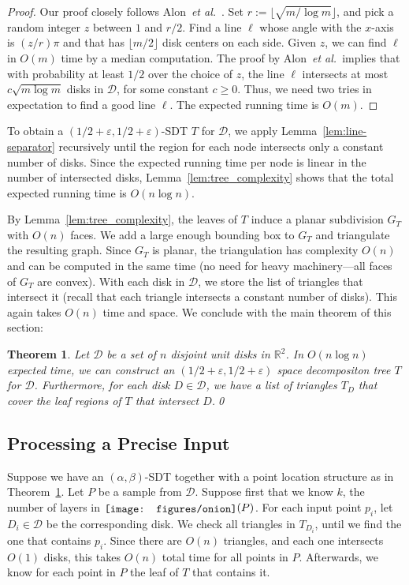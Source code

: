 \documentclass{paper}
\newcommand {\eps} {\varepsilon}
\newcommand {\R} {\mathbb {R}}
\newcommand {\eqdef}{:=}
\newcommand {\script} [1] {\ensuremath {\mathcal {#1}}}
\newcommand {\etal} {\textit {et al.}}
\newcommand {\D} {\script {D}}
\newcommand {\onion} {\raisebox{-0.25ex}{\texttt{[image: figures/onion]}}}
\newtheorem{theorem}{Theorem}[section]
\begin{document}
\begin{proof}
Our proof closely follows Alon~\etal~\cite[Section~2]{akp-cddsl-89}.
Set $r \eqdef \lfloor \sqrt{m/\log m}\rfloor$,
and pick a random integer $z$ between $1$ and $r/2$. 
Find a line $\ell$ whose angle with the $x$-axis is $(z/r)\pi$
and that has $\lfloor m/2 \rfloor $ disk centers on each side.
Given $z$, we can find $\ell$ in $O(m)$ time by a median computation.
The proof by Alon~\etal\ implies that with probability at least $1/2$ over the
choice of $z$, the line $\ell$ intersects at most $c\sqrt{m\log m}$ disks in
$\D$, for some constant $c \geq 0$.
Thus,  
we need two tries in expectation
to find a good line $\ell$. The 
expected running time is $O(m)$. 
\end{proof}

To obtain a $(1/2 + \eps, 1/2 + \eps)$-SDT $T$ for $\D$,  we apply
Lemma~\ref{lem:line-separator} recursively until the region for
each node intersects only a constant number of disks.
Since the expected running time per node is linear
in the number of intersected disks, 
Lemma~\ref{lem:tree_complexity} shows that the total expected running time
is $O(n \log n)$.

By Lemma~\ref{lem:tree_complexity}, the leaves of $T$ induce a planar
subdivision $G_T$ with $O(n)$ faces. We add a large enough
bounding box to $G_T$ and triangulate the resulting graph.
Since $G_T$ is planar, the triangulation has complexity
$O(n)$ and can be computed in the same time (no need for heavy
machinery---all faces of $G_T$ are convex). With each disk
in $\D$, we store the list of triangles that intersect it
(recall that each triangle intersects a constant number of  disks). 
This again takes $O(n)$ time and space.
We conclude with the main theorem of this section:

\begin{theorem}\label{thm:sdt1}
  Let $\D$ be a set of $n$ disjoint unit disks in $\R^2$.
  In $O(n \log n)$ expected time, we can construct
  an $(1/2 + \eps, 1/2 + \eps)$ space decompositon tree $T$ for $\D$. 
  Furthermore, for each disk $D \in \D$, we have
  a list of triangles $T_D$ that cover the leaf
  regions of $T$ that intersect $D$.\qed
\end{theorem}


\subsection{Processing a Precise Input}

Suppose we have an $(\alpha,\beta)$-SDT together with a point location
structure as in Theorem~\ref{thm:sdt1}.
Let $P$ be a sample
from $\D$. Suppose first that we know $k$, the number of 
layers in $\onion(P)$.
For each input point $p_i$, let $D_i \in \D$ be the corresponding disk. 
We check all triangles in $T_{D_i}$,
until we find the one that contains $p_i$.
Since there are $O(n)$ triangles, and each one intersects $O(1)$
disks, this takes $O(n)$ total time
for all points in $P$.
Afterwards, we know for each point in $P$ the leaf of $T$ that contains it.
\end{document}
